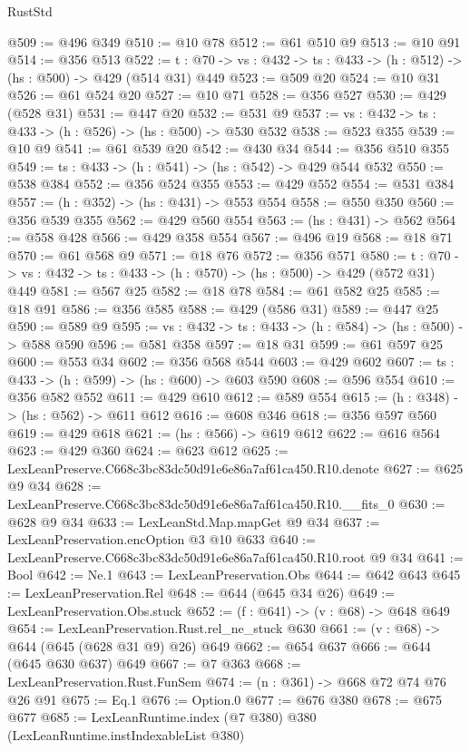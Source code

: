 \begin{lexlean}{RustStd}
\begin{coremodule}
@509 := @496 @349
@510 := @10 @78
@512 := @61 @510 @9
@513 := @10 @91
@514 := @356 @513
@522 := {t : @70} -> {vs : @432} -> {ts : @433} -> (h : @512) -> (hs : @500) -> @429 (@514 @31) @449
@523 := @509 @20
@524 := @10 @31
@526 := @61 @524 @20
@527 := @10 @71
@528 := @356 @527
@530 := @429 (@528 @31)
@531 := @447 @20
@532 := @531 @9
@537 := {vs : @432} -> {ts : @433} -> (h : @526) -> (hs : @500) -> @530 @532
@538 := @523 @355
@539 := @10 @9
@541 := @61 @539 @20
@542 := @430 @34
@544 := @356 @510 @355
@549 := {ts : @433} -> (h : @541) -> (hs : @542) -> @429 @544 @532
@550 := @538 @384
@552 := @356 @524 @355
@553 := @429 @552
@554 := @531 @384
@557 := (h : @352) -> (hs : @431) -> @553 @554
@558 := @550 @350
@560 := @356 @539 @355
@562 := @429 @560 @554
@563 := (hs : @431) -> @562
@564 := @558 @428
@566 := @429 @358 @554
@567 := @496 @19
@568 := @18 @71
@570 := @61 @568 @9
@571 := @18 @76
@572 := @356 @571
@580 := {t : @70} -> {vs : @432} -> {ts : @433} -> (h : @570) -> (hs : @500) -> @429 (@572 @31) @449
@581 := @567 @25
@582 := @18 @78
@584 := @61 @582 @25
@585 := @18 @91
@586 := @356 @585
@588 := @429 (@586 @31)
@589 := @447 @25
@590 := @589 @9
@595 := {vs : @432} -> {ts : @433} -> (h : @584) -> (hs : @500) -> @588 @590
@596 := @581 @358
@597 := @18 @31
@599 := @61 @597 @25
@600 := @553 @34
@602 := @356 @568 @544
@603 := @429 @602
@607 := {ts : @433} -> (h : @599) -> (hs : @600) -> @603 @590
@608 := @596 @554
@610 := @356 @582 @552
@611 := @429 @610
@612 := @589 @554
@615 := (h : @348) -> (hs : @562) -> @611 @612
@616 := @608 @346
@618 := @356 @597 @560
@619 := @429 @618
@621 := (hs : @566) -> @619 @612
@622 := @616 @564
@623 := @429 @360
@624 := @623 @612
@625 := LexLeanPreserve.C668c3bc83dc50d91e6e86a7af61ca450.R10.denote
@627 := @625 @9 @34
@628 := LexLeanPreserve.C668c3bc83dc50d91e6e86a7af61ca450.R10.__fits_0
@630 := @628 @9 @34
@633 := LexLeanStd.Map.mapGet @9 @34
@637 := LexLeanPreservation.encOption @3 @10 @633
@640 := LexLeanPreserve.C668c3bc83dc50d91e6e86a7af61ca450.R10.root @9 @34
@641 := Bool
@642 := Ne.{1}
@643 := LexLeanPreservation.Obs
@644 := @642 @643
@645 := LexLeanPreservation.Rel
@648 := @644 (@645 @34 @26)
@649 := LexLeanPreservation.Obs.stuck
@652 := (f : @641) -> (v : @68) -> @648 @649
@654 := LexLeanPreservation.Rust.rel_ne_stuck @630
@661 := (v : @68) -> @644 (@645 (@628 @31 @9) @26) @649
@662 := @654 @637
@666 := @644 (@645 @630 @637) @649
@667 := @7 @363
@668 := LexLeanPreservation.Rust.FunSem
@674 := (n : @361) -> @668 @72 @74 @76 @26 @91
@675 := Eq.{1}
@676 := Option.{0}
@677 := @676 @380
@678 := @675 @677
@685 := LexLeanRuntime.index (@7 @380) @380 (LexLeanRuntime.instIndexableList @380)

\end{coremodule}
\end{lexlean}
